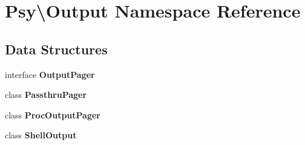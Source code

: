 \section{Psy\textbackslash{}Output Namespace Reference}
\label{namespace_psy_1_1_output}
\subsection*{Data Structures}
\begin{DoxyCompactItemize}
\item 
interface {\bf Output\+Pager}
\item 
class {\bf Passthru\+Pager}
\item 
class {\bf Proc\+Output\+Pager}
\item 
class {\bf Shell\+Output}
\end{DoxyCompactItemize}
